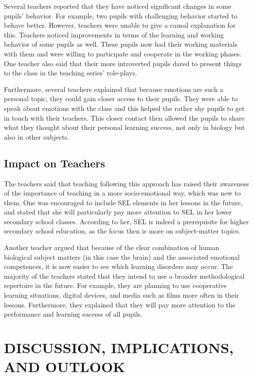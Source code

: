 \documentclass[11.5pt]{sig-alternate} %
\begin{document}
\begin{large}
Several teachers reported that they have noticed significant changes in some pupils’ behavior. For example, two pupils with challenging behavior started to behave better. However, teachers were unable to give a causal explanation for this. Teachers noticed improvements in terms of the learning and working behavior of some pupils as well. These pupils now had their working materials with them and were willing to participate and cooperate in the working phases. One teacher also said that their more introverted pupils dared to present things to the class in the teaching series’ role-plays.

Furthermore, several teachers explained that because emotions are such a personal topic, they could gain closer access to their pupils. They were able to speak about emotions with the class and this helped the rather shy pupils to get in touch with their teachers. This closer contact then allowed the pupils to share what they thought about their personal learning success, not only in biology but also in other subjects.

\subsection*{Impact on Teachers}

The teachers said that teaching following this approach has raised their awareness of the importance of teaching in a more socio-emotional way, which was new to them. One was encouraged to include SEL elements in her lessons in the future, and stated that she will particularly pay more attention to SEL in her lower secondary school classes. According to her, SEL is indeed a prerequisite for higher secondary school education, as the focus then is more on subject-matter topics.

Another teacher argued that because of the clear combination of human biological subject matters (in this case the brain) and the associated emotional competences, it is now easier to see which learning disorders may occur. The majority of the teachers stated that they intend to use a broader methodological repertoire in the future. For example, they are planning to use cooperative learning situations, digital devices, and media such as films more often in their lessons. Furthermore, they explained that they will pay more attention to the performance and learning success of all pupils.

\section*{DISCUSSION, IMPLICATIONS, AND OUT\-LOOK}


\end{large}
\end{document}
